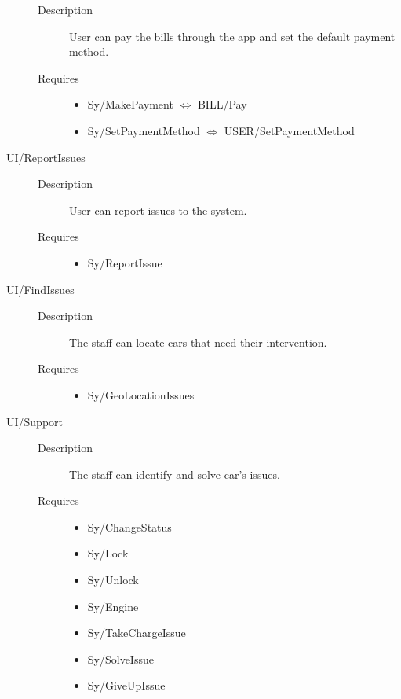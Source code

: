 \documentclass[11pt]{article} %
\begin{document}
\begin{description}
	\begin{description}
		\item[Description] User can pay the bills through the app and set the default payment method.
		\item[Requires] \hfill
		\begin{itemize}
			\item Sy/MakePayment $\Leftrightarrow$ BILL/Pay
			\item Sy/SetPaymentMethod $\Leftrightarrow$ USER/SetPaymentMethod
		\end{itemize}
	\end{description}
	\item[UI/ReportIssues] \hfill
	\begin{description}
		\item[Description] User can report issues to the system.
		\item[Requires] \hfill
		\begin{itemize}
			\item Sy/ReportIssue
		\end{itemize}
	\end{description}
	\item[UI/FindIssues] \hfill
	\begin{description}
		\item[Description] The staff can locate cars that need their intervention.
		\item[Requires] \hfill
		\begin{itemize}
			\item Sy/GeoLocationIssues
		\end{itemize}
	\end{description}
	\item[UI/Support] \hfill
	\begin{description}
		\item[Description] The staff can identify and solve car’s issues.
		\item[Requires] \hfill
		\begin{itemize}
			\item Sy/ChangeStatus
			\item Sy/Lock
			\item Sy/Unlock
			\item Sy/Engine
			\item Sy/TakeChargeIssue
			\item Sy/SolveIssue
			\item Sy/GiveUpIssue
		\end{itemize}
	\end{description}
\end{description}
\end{document}
